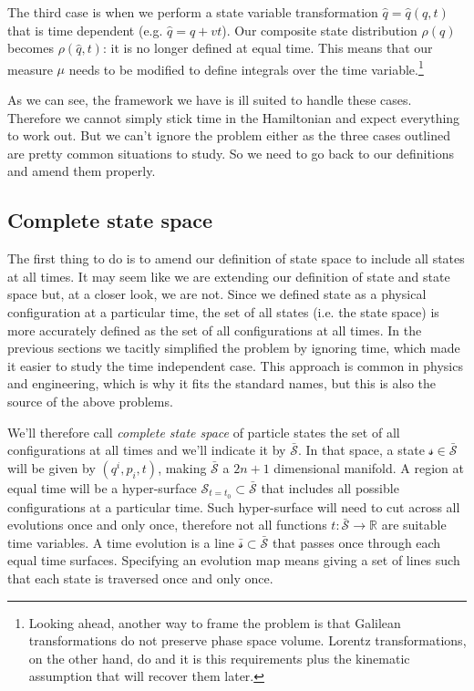 \documentclass[smallextended]{svjour3}
\numberwithin{equation}{section}
\theoremstyle{definition}
\begin{document}
The third case is when we perform a state variable transformation $\hat{q}=\hat{q}(q,t)$ that is time dependent (e.g. $\hat{q}=q+vt$). Our composite state distribution $\rho(q)$ becomes $\rho(\hat{q},t)$: it is no longer defined at equal time. This means that our measure $\mu$ needs to be modified to define integrals over the time variable.\footnote{Looking ahead, another way to frame the problem is that Galilean transformations do not preserve phase space volume. Lorentz transformations, on the other hand, do\cite{Treumann} and it is this requirements plus the kinematic assumption that will recover them later.}

As we can see, the framework we have is ill suited to handle these cases. Therefore we cannot simply stick time in the Hamiltonian and expect everything to work out. But we can't ignore the problem either as the three cases outlined are pretty common situations to study. So we need to go back to our definitions and amend them properly.

\subsection{Complete state space}

The first thing to do is to amend our definition of state space to include all states at all times. It may seem like we are extending our definition of state and state space but, at a closer look, we are not. Since we defined state as a physical configuration at a particular time, the set of all states (i.e. the state space) is more accurately defined as the set of all configurations at all times. In the previous sections we tacitly simplified the problem by ignoring time, which made it easier to study the time independent case. This approach is common in physics and engineering, which is why it fits the standard names, but this is also the source of the above problems.

We'll therefore call \emph{complete state space} of particle states the set of all configurations at all times and we'll indicate it by $\bar{\mathcal{S}}$. In that space, a state $\mathcal{s} \in \bar{\mathcal{S}}$ will be given by $(q^i, p_i, t)$, making $\bar{\mathcal{S}}$ a $2n+1$ dimensional manifold. A region at equal time will be a hyper-surface $\mathcal{S}_{t=t_0} \subset \bar{\mathcal{S}}$ that includes all possible configurations at a particular time. Such hyper-surface will need to cut across all evolutions once and only once, therefore not all functions $t : \bar{\mathcal{S}} \rightarrow \mathbb{R}$ are suitable time variables. A time evolution is a line  $\bar{\mathcal{s}} \subset \bar{\mathcal{S}}$ that passes once through each equal time surfaces. Specifying an evolution map means giving a set of lines such that each state is traversed once and only once.
\end{document}
